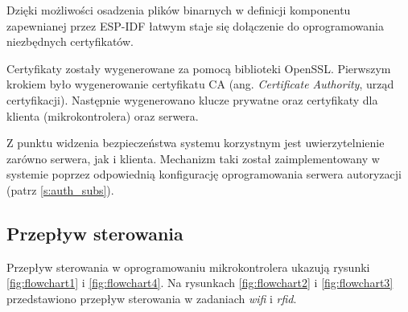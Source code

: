             Dzięki możliwości osadzenia plików binarnych w definicji komponentu zapewnianej przez ESP-IDF łatwym staje się dołączenie do oprogramowania niezbędnych certyfikatów.

            Certyfikaty zostały wygenerowane za pomocą biblioteki OpenSSL. Pierwszym krokiem było wygenerowanie certyfikatu CA (ang. \textit{Certificate Authority}, urząd certyfikacji). Następnie wygenerowano klucze prywatne oraz certyfikaty dla klienta (mikrokontrolera) oraz serwera.

            Z punktu widzenia bezpieczeństwa systemu korzystnym jest uwierzytelnienie zarówno serwera, jak i klienta. Mechanizm taki został zaimplementowany w systemie poprzez odpowiednią konfigurację oprogramowania serwera autoryzacji (patrz \ref{s:auth_subs}).

        \subsection{Przepływ sterowania}

            Przepływ sterowania w oprogramowaniu mikrokontrolera ukazują rysunki \ref{fig:flowchart1} i \ref{fig:flowchart4}. Na rysunkach \ref{fig:flowchart2} i \ref{fig:flowchart3} przedstawiono przepływ sterowania w zadaniach \textit{wifi} i \textit{rfid}.

